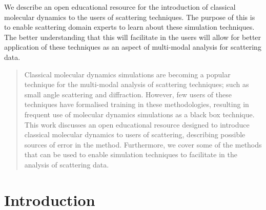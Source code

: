 \documentclass[pdf]{iucr}              %
\begin{document}

\maketitle                        %

\begin{synopsis}
We describe an open educational resource for the introduction of classical molecular dynamics to the users of scattering techniques.
The purpose of this is to enable scattering domain experts to learn about these simulation techniques.
The better understanding that this will facilitate in the users will allow for better application of these techniques as an aspect of multi-modal analysis for scattering data.
\end{synopsis}

\begin{abstract}
Classical molecular dynamics simulations are becoming a popular technique for the multi-modal analysis of scattering techniques; such as small angle scattering and diffraction.
However, few users of these techniques have formalised training in these methodologies, resulting in frequent use of molecular dynamics simulations as a black box technique.
This work discusses an open educational resource designed to introduce classical molecular dynamics to users of scattering, describing possible sources of error in the method.
Furthermore, we cover some of the methods that can be used to enable simulation techniques to facilitate in the analysis of scattering data.
\end{abstract}



\section{Introduction}
\end{document}
